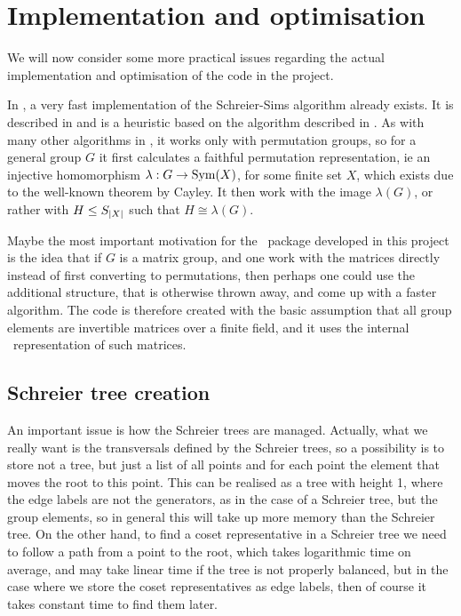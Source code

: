 \chapter{Implementation and optimisation}

We will now consider some more practical issues regarding the actual
implementation and optimisation of the code in the project.

In \GAP, a very fast implementation of the Schreier-Sims algorithm already
exists. It is described in \cite{seress03} and is a heuristic based on
the algorithm described in \cite{seress91}. As with many other
algorithms in \GAP, it works only with permutation groups, so for a
general group $G$ it first calculates a faithful permutation
representation, ie an injective homomorphism $\lambda : G \to
\operatorname{Sym}( X )$, for some finite set $X$, which exists due to the well-known theorem by Cayley. It
then work with the image $\lambda(G)$, or rather with $H \leq S_{\left\lvert X \right\rvert}$ such that $H \cong \lambda(G)$.

Maybe the most important motivation for the \GAP~package developed in
this project is the idea that if $G$ is a matrix group, and one work
with the matrices directly instead of first converting to
permutations, then perhaps one could use the additional structure, that
is otherwise thrown away, and come up with a faster algorithm. The code is 
therefore created with the basic assumption that all group elements are
invertible matrices over a finite field, and it uses the internal
\GAP~representation of such matrices.

\section{Schreier tree creation}
An important issue is how the Schreier trees are managed. Actually,
what we really want is the transversals defined by the Schreier trees,
so a possibility is to store not a tree, but just a list of all points
and for each point the element that moves the root to this point. This
can be realised as a tree with height 1, where the edge labels are not
the generators, as in the case of a Schreier tree, but the group
elements, so in general this will take up more memory than the
Schreier tree. On the other hand, to find a coset representative in a
Schreier tree we need to follow a path from a point to the root, which
takes logarithmic time on average, and may take linear time if the
tree is not properly balanced, but in the case where we store the
coset representatives as edge labels, then of course it takes constant
time to find them later. 

